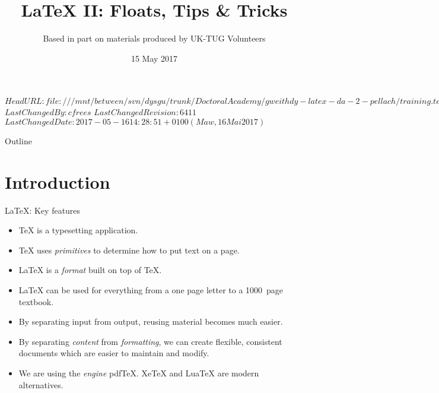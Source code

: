 \svnidlong
{$HeadURL: file:///mnt/between/svn/dysgu/trunk/DoctoralAcademy/gweithdy-latex-da-2-pellach/training.tex $}
{$LastChangedBy: cfrees $}
{$LastChangedRevision: 6411 $}
{$LastChangedDate: 2017-05-16 14:28:51 +0100 (Maw, 16 Mai 2017) $}

\usepackage[citestyle=authoryear-comp,bibstyle=authoryear,mergedate=basic,isbn=false,url=true,sortcites=true,backend=biber,mincrossrefs=6]{biblatex}




\title{\LaTeX{} II: Floats, Tips \& Tricks}
\subtitle{Based in part on materials produced by UK-TUG Volunteers}
\date{ 15 May 2017}




\begin{frame}
  \titlepage
\end{frame}

\maketitle


\tableofcontents

%
{
  \begin{frame}{Outline}
	\tableofcontents
  \end{frame}
}

%

\section{Introduction}

\begin{frame}{\LaTeX{}: Key features}

  \begin{itemize}
	\item \TeX{} is a typesetting application.
	\item \TeX{} uses \emph{primitives} to determine how to put text on a page.
	\item \LaTeX{} is  a \emph{format} built on top of \TeX{}.
	\item \LaTeX{} can be used for everything from a one page letter to a 1000~page textbook.
	\item By separating input from output, reusing material becomes much easier.
	\item By separating \emph{content} from \emph{formatting}, we can create flexible, consistent documents which are easier to maintain and modify.
	\item We are using the \emph{engine} pdf\TeX{}.
	Xe\TeX{} and Lua\TeX{} are modern alternatives.
  \end{itemize}

\end{frame}

